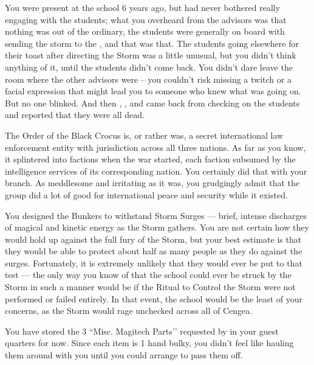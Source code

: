 \documentclass[char]{GL2020}
\begin{document}
\begin{itemz}[Notes]
	\item You were present at the school 6 years ago, but had never bothered really engaging with the students; what you overheard from the advisors was that nothing was out of the ordinary, the students were generally on board with sending the storm to the \pTech{}, and that was that. The students going elsewhere for their toast after directing the Storm was a little unusual, but you didn't think anything of it, until the students didn't come back. You didn't dare leave the room where the other advisors were – you couldn't risk missing a twitch or a facial expression that might lead you to someone who knew what was going on. But no one blinked. And then \cPrincipal{}, \cDiplomat{\full}, and \cMusic{\full} came back from checking on the students and reported that they were all dead.
	\item The Order of the Black Crocus is, or rather was, a secret international law enforcement entity with jurisdiction across all three nations. As far as you know, it splintered into factions when the war started, each faction subsumed by the intelligence services of its corresponding nation. You certainly did that with your branch. As meddlesome and irritating as it was, you grudgingly admit that the group did a lot of good for international peace and security while it existed.
	\item You designed the Bunkers to withstand Storm Surges — brief, intense discharges of magical and kinetic energy as the Storm gathers. You are not certain how they would hold up against the full fury of the Storm, but your best estimate is that they would be able to protect about half as many people as they do against the surges. Fortunately, it is extremely unlikely that they would ever be put to that test — the only way you know of that the school could ever be struck by the Storm in such a manner would be if the Ritual to Control the Storm were not performed or failed entirely. In that event, the school would be the least of your concerns, as the Storm would rage unchecked across all of Cengea.
	\item You have stored the 3 ``Misc. Magitech Parts'’ requested by \cTechStar{} in your guest quarters for now. Since each item is 1 hand bulky, you didn't feel like hauling them around with you until you could arrange to pass them off.
\end{itemz}
\end{document}
